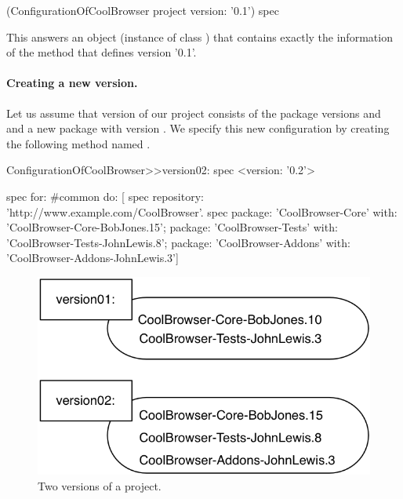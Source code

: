 \documentclass[a4paper,10pt,twoside]{book}
\begin{document}
\begin{code}{}
	(ConfigurationOfCoolBrowser project version: '0.1') spec
\end{code}

This  answers an object (instance of class ) that contains exactly the information of the method that defines version '0.1'.





\paragraph{Creating a new version.}
Let us assume that version  of our project consists of the package versions \mbox{} and \mbox{} and a new package  with version . We specify this new configuration by creating the following method named .

\begin{code}{}
ConfigurationOfCoolBrowser>>version02: spec
      <version: '0.2'>

      spec for: #common do: [
            spec repository: 'http://www.example.com/CoolBrowser'.
            spec
                  package: 'CoolBrowser-Core' with: 'CoolBrowser-Core-BobJones.15';
                  package: 'CoolBrowser-Tests' with: 'CoolBrowser-Tests-JohnLewis.8';
                  package: 'CoolBrowser-Addons' with: 'CoolBrowser-Addons-JohnLewis.3']
\end{code}

\begin{figure}
\begin{center}
\includegraphics[width=0.6\linewidth]{version02}
\caption{Two versions of a project.}
\end{center}
\end{figure}
\end{document}
